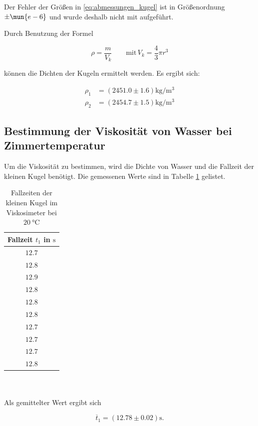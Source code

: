 Der Fehler der Größen in \eqref{eq:abmessungen_kugel} ist in Größenordnung $\pm \mun{e-6}$ 
und wurde deshalb nicht mit aufgeführt.

Durch Benutzung der Formel

\begin{equation*}
\rho=\frac{m}{V_{k}} \qquad \text{mit} \, V_{k}=\frac{4}{3}\pi r^3
\end{equation*}

können die Dichten der Kugeln ermittelt werden.
Es ergibt sich:

\begin{align*}
\rho_{1}&=\left(\num{2451.0}\pm\num{1.6}\right) \si{\kilogram\per\cubic\meter}\\
\rho_{2}&=\left(\num{2454.7}\pm\num{1.5}\right) \si{\kilogram\per\cubic\meter}
\end{align*}

\subsection{Bestimmung der Viskosität von Wasser bei Zimmertemperatur} \label{sec:visko}
Um die Viskosität zu bestimmen, wird die Dichte von Wasser und die Fallzeit der kleinen Kugel benötigt.
Die gemessenen Werte sind in Tabelle \ref{tab:messwerte_fallzeit_kugel_klein} gelistet. 
\begin{table}
\centering
\begin{tabular} {c}
	\toprule
  Fallzeit $t_1$ in $\si{\second}$ \\
  \midrule
  $\num{12.7}$ \\
  $\num{12.8}$ \\
  $\num{12.9}$ \\
  $\num{12.8}$ \\
  $\num{12.8}$ \\
  $\num{12.8}$ \\
  $\num{12.7}$ \\
  $\num{12.7}$ \\
  $\num{12.7}$ \\
  $\num{12.8}$ \\
\bottomrule
\end{tabular}
\caption{Fallzeiten der kleinen Kugel im Viskosimeter bei $\SI{20}{\degreeCelsius}$}
\label{tab:messwerte_fallzeit_kugel_klein}
\end{table}
\\
\\
\hfill
Als gemittelter Wert ergibt sich

\begin{equation}
\label{eq:gemittelte_fallzeit_klein}
\overline{t}_{1}=\left(\num{12.78}\pm\num{0.02}\right) \si{\second}.
\end{equation}

